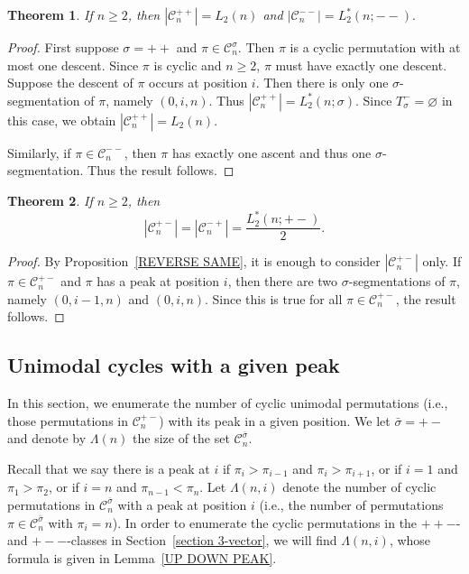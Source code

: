 \documentclass[12pt]{article}
\newcommand{\todo}[1]{\vspace{2 mm}\par\noindent
   \marginpar[\flushright\textsc{ToDo}]{\textsc{ToDo}}\framebox{\begin{minipage}[c]{\textwidth}
   \tt #1 \end{minipage}}\vspace{2 mm}\par}
\newcommand{\C}{\mathcal{C}}
\theoremstyle{plain}
\newtheorem{theorem}{Theorem}
\theoremstyle{definition}
\begin{document}
\begin{theorem}\label{thm: ++ and --}
If $n\geq 2$, then $|\C_n^{++}| = L_2(n)$ and $|\C_n^{--}| = L_2^*(n;--).$
\end{theorem}

\begin{proof}
First suppose $\sigma=++$ and $\pi\in\C_n^{\sigma}$. Then $\pi$ is a cyclic permutation with at most one descent. Since $\pi$ is cyclic and $n\geq 2$, $\pi$ must have exactly one descent. Suppose the descent of $\pi$ occurs at position $i$. Then there is only one $\sigma$-segmentation of $\pi$, namely $(0,i,n)$. Thus $|\C_n^{++}| = L^*_2(n;\sigma)$. Since $T_\sigma^-=\varnothing$ in this case, we obtain $|\C_n^{++}| = L_2(n)$. 

Similarly, if $\pi\in\C_n^{--}$, then $\pi$ has exactly one ascent and thus one $\sigma$-segmentation. Thus the result follows.
\end{proof}

\begin{theorem}
If $n\geq 2$, then $$|\C_n^{+-}| =|\C_n^{-+}| = \frac{L_2^*(n;+-)}{2}.$$
\end{theorem}
\begin{proof}
By Proposition~\ref{REVERSE SAME}, it is enough to consider $|\C_n^{+-}|$ only. If $\pi \in \C_n^{+-}$ and $\pi$ has a peak at position $i$, then there are two $\sigma$-segmentations of $\pi$, namely $(0, i-1, n)$ and $(0, i, n)$. Since this is true for all $\pi\in\C_n^{+-}$, the result follows.
\end{proof}

\subsection{Unimodal cycles with a given peak}

In this section, we enumerate the number of cyclic unimodal permutations (i.e., those permutations in $\C_n^{+-}$) with its peak in a given position.
We let $\bar\sigma = +-$ and denote by $\Lambda(n)$ the size of the set $\C_n^{\bar\sigma}$. %

Recall that we say there is a peak at $i$ if $\pi_i>\pi_{i-1}$ and $\pi_i>\pi_{i+1}$, or if $i=1$ and $\pi_1>\pi_2$, or if $i=n$ and $\pi_{n-1}<\pi_n$. 
Let $\Lambda(n,i)$ denote the number of cyclic permutations in $\C_n^{\bar\sigma}$ with a peak at position $i$ (i.e., the number of permutations $\pi\in \C^{\bar\sigma}_n$ with $\pi_i = n$). 
In order to enumerate the cyclic permutations in the $++-$- and $+--$-classes in Section~\ref{section 3-vector}, we will find $\Lambda(n,i)$, whose formula is given in Lemma~\ref{UP DOWN PEAK}.
\end{document}
